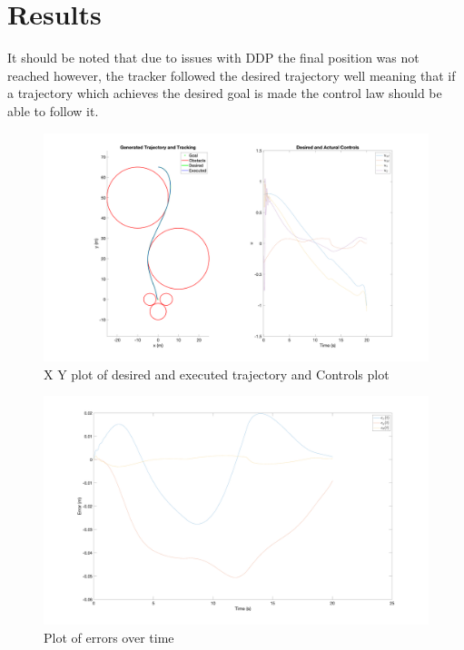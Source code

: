 \documentclass[letterpaper, 12pt]{article}
\begin{document}
\section{Results}
It should be noted that due to issues with DDP the final position was not reached however, the tracker followed the desired trajectory well meaning that if a trajectory which achieves the desired goal is made the control law should be able to follow it.
\begin{figure}
    \centering
    \includegraphics[width=\textwidth]{Report/figures/plot_and_controls.png}
    \caption{X Y plot of desired and executed trajectory and Controls plot}
    \label{fig:my_label}
\end{figure}

\begin{figure}[t]
    \centering
    \includegraphics[width=\textwidth]{Report/figures/Error.png}
    \caption{Plot of errors over time}
    \label{fig:my_label}
\end{figure}
\end{document}
